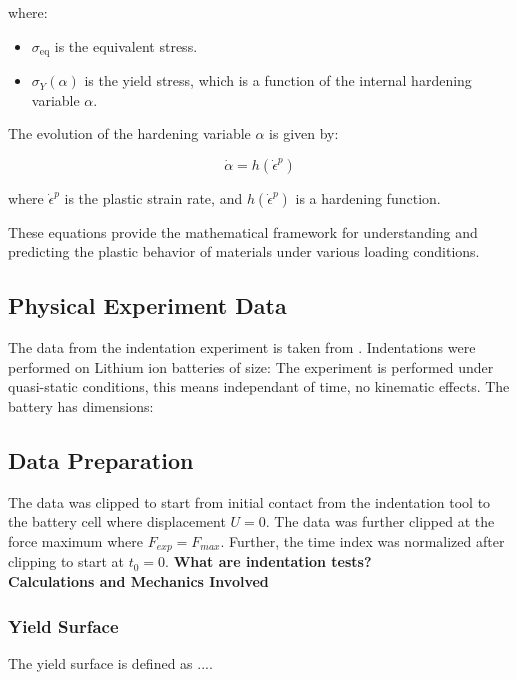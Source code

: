 where:
\begin{itemize}
    \item $\sigma_{\text{eq}}$ is the equivalent stress.
    \item $\sigma_Y(\alpha)$ is the yield stress, which is a function of the internal hardening variable $\alpha$.
\end{itemize}

The evolution of the hardening variable $\alpha$ is given by:

\begin{equation}
\dot{\alpha} = h(\dot{\epsilon}^p)
\end{equation}

where $\dot{\epsilon}^p$ is the plastic strain rate, and $h(\dot{\epsilon}^p)$ is a hardening function.



These equations provide the mathematical framework for understanding and predicting the plastic behavior of materials under various loading conditions.


\subsection{Physical Experiment Data}
The data from the indentation experiment is taken from \cite{Tancogne-Ind}. Indentations were performed on Lithium ion batteries of size:
The experiment is performed under quasi-static conditions, this means independant of time, no kinematic effects.
The battery has dimensions:

\subsection{Data Preparation}
The data was clipped to start from initial contact from the indentation tool to the battery cell where displacement $U = 0$. The data was further clipped at the force maximum where $F_{exp} = F_{max}$. Further, the time index was normalized after clipping to start at $t_0 = 0$.
\textbf{What are indentation tests?}\\



\textbf{Calculations and Mechanics Involved}\\

\subsubsection{Yield Surface}
The yield surface is defined as ....

